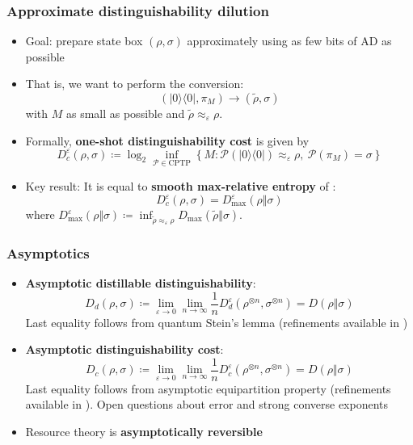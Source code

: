 \documentclass[usenames,dvipsnames,handout]{beamer}
\begin{document}
\begin{frame}
\frametitle{Approximate distinguishability dilution}

\begin{itemize}

\pause
\item Goal: prepare state box $(\rho,\sigma)$ approximately using as few bits of AD as possible

\pause
\item That is, we want to perform the conversion:
$$
(|0\rangle\!\langle 0 |, \pi_M) \rightarrow  (\widetilde{\rho},\sigma) 
$$
with $M$ as small as possible and $\widetilde{\rho} \approx_{\varepsilon} \rho$.

\pause
\item Formally, {\color{MidnightBlue}\textbf{one-shot distinguishability cost}}  is given by
$$
D_{c}^{\varepsilon}(\rho,\sigma)\coloneqq 
\log_{2}\inf_{\mathcal{P}\in\text{CPTP}}\left\{  M:\mathcal{P}(|0\rangle
\langle0|)\approx_{\varepsilon}\rho,\ \mathcal{P}(\pi_{M})=\sigma\right\}  
$$

\pause
\item Key result: It is equal to {\color{MidnightBlue}\textbf{smooth max-relative entropy}} of \cite{D09}:
$$
D_{c}^{\varepsilon}(\rho,\sigma)=D_{\max}^{\varepsilon}(\rho\Vert\sigma)
$$
where $D_{\max}^{\varepsilon}(\rho\Vert\sigma)    \coloneqq \inf_{\widetilde{\rho} \approx_{\varepsilon} \rho}D_{\max}(\widetilde{\rho} \Vert \sigma)$.

\end{itemize}

\end{frame}


\begin{frame}
\frametitle{Asymptotics}

\begin{itemize}

\pause
\item {\color{MidnightBlue}\textbf{Asymptotic distillable distinguishability}}:
$$
D_{d}(\rho,\sigma)  \coloneqq  \lim_{\varepsilon \to 0} \lim_{n \to \infty}\frac{1}{n}D_{d}^{\varepsilon}(\rho^{\otimes n},\sigma^{\otimes n}) 
  = D(\rho \Vert \sigma)
$$
Last equality follows from quantum Stein's lemma \cite{HP91} (refinements available in \cite{ON00,N06,Hay07,tomamichel2013hierarchy,li14,MO13})

\pause
\item {\color{MidnightBlue}\textbf{Asymptotic distinguishability cost}}:
$$
D_{c}(\rho,\sigma)  \coloneqq  \lim_{\varepsilon \to 0} \lim_{n \to \infty}\frac{1}{n}D_{c}^{\varepsilon}(\rho^{\otimes n},\sigma^{\otimes n}) 
 = D(\rho \Vert \sigma)
$$
Last equality follows from asymptotic equipartition property \cite{TCR09} (refinements available in \cite{tomamichel2013hierarchy}). Open questions about error and strong converse exponents

\pause
\item Resource theory is {\color{MidnightBlue}\textbf{asymptotically reversible}}

\end{itemize}

\end{frame}
\end{document}
